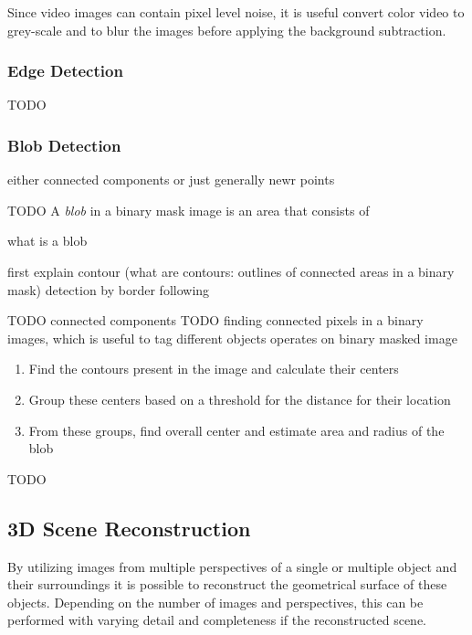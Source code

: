 Since video images can contain pixel level noise, it is useful convert color video to grey-scale and to blur the images before applying the background subtraction.

\subsubsection{Edge Detection}

TODO

\subsubsection{Blob Detection}

either connected components or just generally newr points

TODO
A \emph{blob} in a binary mask image is an area that consists of 

what is a blob

first explain contour (what are contours: outlines of connected areas in a binary mask) detection by border following \autocite[][]{suzuki1985border}



TODO connected components
TODO 
\autocite[][]{he2017connected}
finding connected pixels in a binary images, which is useful to tag different objects
\autocite[][]{opencv2018blob}
operates on binary masked image
\begin{enumerate}
    \item Find the contours present in the image and calculate their centers
    \item Group these centers based on a threshold for the distance for their location
    \item From these groups, find overall center and estimate area and radius of the blob
\end{enumerate}



TODO




\subsection{3D Scene Reconstruction}

By utilizing images from multiple perspectives of a single or multiple object and their surroundings
it is possible to reconstruct the geometrical surface of these objects.
Depending on the number of images and perspectives, this can be performed with varying detail and completeness if the reconstructed scene.

